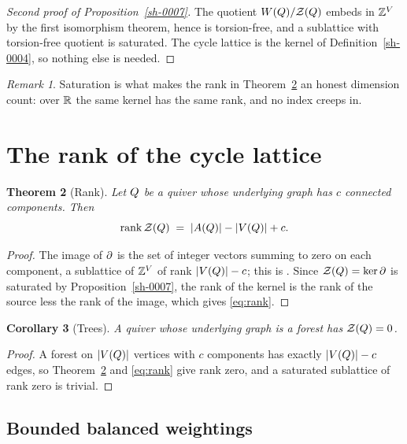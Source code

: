 \documentclass[11pt]{amsart}
\theoremstyle{plain}
\newtheorem{theorem}{Theorem}[section]
\newtheorem{corollary}[theorem]{Corollary}
\theoremstyle{definition}
\theoremstyle{remark}
\newtheorem{remark}[theorem]{Remark}
\begin{document}
\begin{proof}[Second proof of Proposition~\ref{sh-0007}]\label{sh-0010}
The quotient $W(Q) / \mathcal{Z}(Q)$ embeds in $\mathbb{Z}^{V}$ by the first isomorphism theorem, hence is torsion-free, and a sublattice with torsion-free quotient is saturated. The cycle lattice is the kernel of Definition~\ref{sh-0004}, so nothing else is needed.
\end{proof}


\begin{remark}\label{sh-0008}
Saturation is what makes the rank in Theorem~\ref{sh-0009} an honest dimension count: over $\mathbb{R}$ the same kernel has the same rank, and no index creeps in.
\end{remark}


\section{The rank of the cycle lattice}\label{sh-0300}

\begin{theorem}[Rank]\label{sh-0009}
Let $Q$ be a quiver whose underlying graph has $c$ connected components. Then
\begin{equation}\label{eq:rank}
\operatorname{rank} \mathcal{Z}(Q) \;=\; |A(Q)| - |V(Q)| + c.
\end{equation}
\end{theorem}
\begin{proof}
The image of $\partial$ is the set of integer vectors summing to zero on each component, a sublattice of $\mathbb{Z}^{V}$ of rank $|V(Q)| - c$; this is \cite[Proposition 2.1]{Arden24}. Since $\mathcal{Z}(Q) = \ker \partial$ is saturated by Proposition~\ref{sh-0007}, the rank of the kernel is the rank of the source less the rank of the image, which gives \eqref{eq:rank}.
\end{proof}


\begin{corollary}[Trees]\label{sh-000A}
A quiver whose underlying graph is a forest has $\mathcal{Z}(Q) = 0$.
\end{corollary}
\begin{proof}
A forest on $|V(Q)|$ vertices with $c$ components has exactly $|V(Q)| - c$ edges, so Theorem~\ref{sh-0009} and \eqref{eq:rank} give rank zero, and a saturated sublattice of rank zero is trivial.
\end{proof}


\subsection{Bounded balanced weightings}\label{sh-0301}
\end{document}
